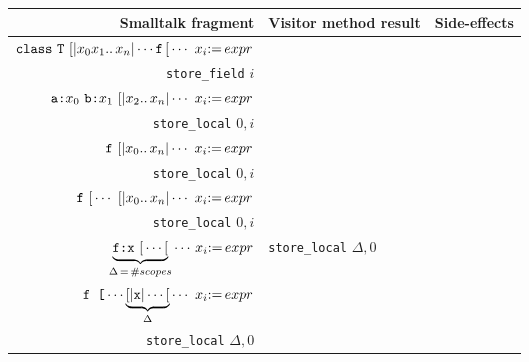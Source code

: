 \documentclass[11pt]{article}
\begin{document}
\begin{figure}
\begin{center}
\begin{tabular}[t]{r | l | l }
{\bf Smalltalk fragment} & {\bf Visitor method result} & {\bf Side-effects}\\
\hline
${\tt class~ T~[|}x_0 x_1 ..\, x_n|\cdots {\tt f} \,[\, \cdots~ x_i {\tt :=} \,expr$ &
\begin{minipage}[t]{0.25\linewidth}
$expr$\\
{\tt store\_field} $i$\vspace{5pt}
\end{minipage} & \\

$\text{\tt a:}x_0 \,\,\text{\tt b:}x_1~{\tt [|}x_2 ..\, x_n |\cdots~ x_i {\tt :=} \,expr$ &
\begin{minipage}[t]{0.25\linewidth}
$expr$\\
{\tt store\_local} $0, i$\vspace{3pt}
\end{minipage} & \\

${\tt f~[|}x_0 ..\, x_n| \cdots~ x_i {\tt :=} \,expr$ &
\begin{minipage}[t]{0.25\linewidth}
$expr$\\
{\tt store\_local} $0, i$\vspace{3pt}
\end{minipage} & \\

${\tt f~[\, \cdots~ [|}x_0 ..\, x_n| \cdots~ x_i {\tt :=} \,expr$ &
\begin{minipage}[t]{0.25\linewidth}
$expr$\\
{\tt store\_local} $0, i$\vspace{3pt}
\end{minipage} & \\

$\underbrace{\text{\tt f:}{\tt x~}{\tt [}\cdots [}_{\Delta \,=\,\#scopes} \cdots\, x_i {\tt :=}\, expr$ &
\begin{minipage}[t]{0.25\linewidth}
{\tt store\_local} $\Delta, 0$
\end{minipage} & \\

$\text{\tt f [}\cdots\underbrace{{\tt [|x| }\cdots [}_{\Delta}\cdots~ x_i {\tt :=} \,expr$ &
\begin{minipage}[t]{0.25\linewidth}
$expr$\\
{\tt store\_local} $\Delta, 0$\vspace{5pt}
\end{minipage} & \\


\end{tabular}
\end{center}
\end{figure}
\end{document}
